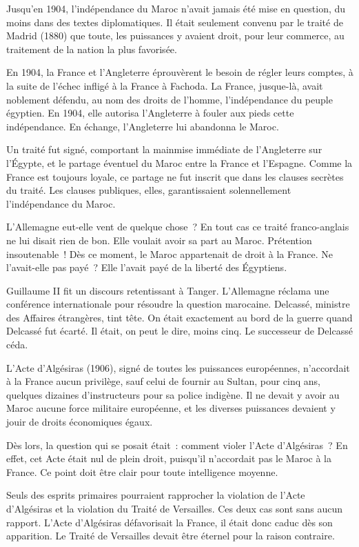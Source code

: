\documentclass[french,twoside]{book} %
\begin{document}
\noindent Jusqu'en 1904, l'indépendance du Maroc n'avait jamais été mise en question, du moins dans des textes diplomatiques. Il était seulement convenu par le traité de Madrid (1880) que toute, les puissances y avaient droit, pour leur commerce, au traitement de la nation la plus favorisée.\par
En 1904, la France et l'Angleterre éprouvèrent le besoin de régler leurs comptes, à la suite de l'échec infligé à la France à Fachoda. La France, jusque-là, avait noblement défendu, au nom des droits de l'homme, l'indépendance du peuple égyptien. En 1904, elle autorisa l'Angleterre à fouler aux pieds cette indépendance. En échange, l'Angleterre lui abandonna le Maroc.\par
Un traité fut signé, comportant la mainmise immédiate de l'Angleterre sur l'Égypte, et le partage éventuel du Maroc entre la France et l'Espagne. Comme la France est toujours loyale, ce partage ne fut inscrit que dans les clauses secrètes du traité. Les clauses publiques, elles, garantissaient solennellement l'indépendance du Maroc.\par
L'Allemagne eut-elle vent de quelque chose ? En tout cas ce traité franco-anglais ne lui disait rien de bon. Elle voulait avoir sa part au Maroc. Prétention insoutenable ! Dès ce moment, le Maroc appartenait de droit à la France. Ne l'avait-elle pas payé ? Elle l'avait payé de la liberté des Égyptiens.\par
Guillaume II fit un discours retentissant à Tanger. L'Allemagne réclama une conférence internationale pour résoudre la question marocaine. Delcassé, ministre des Affaires étrangères, tint tête. On était exactement au bord de la guerre quand Delcassé fut écarté. Il était, on peut le dire, moins cinq. Le successeur de Delcassé céda.\par
L'Acte d'Algésiras (1906), signé de toutes les puissances européennes, n'accordait à la France aucun privilège, sauf celui de fournir au Sultan, pour cinq ans, quelques dizaines d'instructeurs pour sa police indigène. Il ne devait y avoir au Maroc aucune force militaire européenne, et les diverses puissances devaient y jouir de droits économiques égaux.\par
Dès lors, la question qui se posait était : comment violer l'Acte d'Algésiras ? En effet, cet Acte était nul de plein droit, puisqu'il n'accordait pas le Maroc à la France. Ce point doit être clair pour toute intelligence moyenne.\par
Seuls des esprits primaires pourraient rapprocher la violation de l'Acte d'Algésiras et la violation du Traité de Versailles. Ces deux cas sont sans aucun rapport. L'Acte d'Algésiras défavorisait la France, il était donc caduc dès son apparition. Le Traité de Versailles devait être éternel pour la raison contraire.\par
\end{document}
